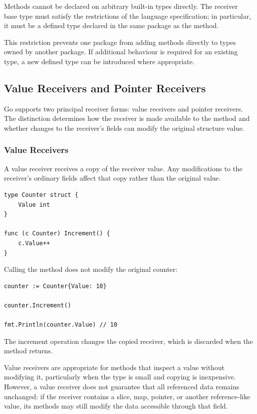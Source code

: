 Methods cannot be declared on arbitrary built-in types directly. The receiver base type must satisfy the restrictions of the language specification; in particular, it must be a defined type declared in the same package as the method.

This restriction prevents one package from adding methods directly to types owned by another package. If additional behaviour is required for an existing type, a new defined type can be introduced where appropriate.

\subsection{Value Receivers and Pointer Receivers}

Go supports two principal receiver forms: value receivers and pointer receivers. The distinction determines how the receiver is made available to the method and whether changes to the receiver's fields can modify the original structure value.

\subsubsection{Value Receivers}

A value receiver receives a copy of the receiver value. Any modifications to the receiver's ordinary fields affect that copy rather than the original value.

\begin{lstlisting}
type Counter struct {
    Value int
}

func (c Counter) Increment() {
    c.Value++
}
\end{lstlisting}

Calling the method does not modify the original counter:

\begin{lstlisting}
counter := Counter{Value: 10}

counter.Increment()

fmt.Println(counter.Value) // 10
\end{lstlisting}

The increment operation changes the copied receiver, which is discarded when the method returns.

Value receivers are appropriate for methods that inspect a value without modifying it, particularly when the type is small and copying is inexpensive. However, a value receiver does not guarantee that all referenced data remains unchanged: if the receiver contains a slice, map, pointer, or another reference-like value, its methods may still modify the data accessible through that field.

